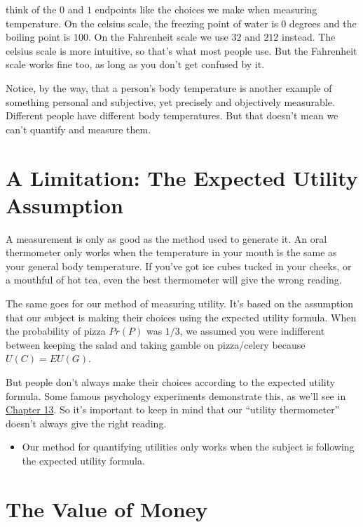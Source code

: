 \documentclass[justified]{tufte-book}
\renewcommand{\u}{U}
\newcommand{\p}{Pr}
\newcommand{\EU}{EU}
\newenvironment{warning}{\begin{itemize}\item[\faBan]}{\end{itemize}}
\theoremstyle{definition}
\theoremstyle{definition}
\theoremstyle{definition}
\theoremstyle{definition}
\theoremstyle{remark}
\begin{document}
 think of the \(0\) and \(1\) endpoints like the choices we make when measuring temperature. On the celsius scale, the freezing point of water is \(0\) degrees and the boiling point is \(100\). On the Fahrenheit scale we use \(32\) and \(212\) instead. The celsius scale is more intuitive, so that's what most people use. But the Fahrenheit scale works fine too, as long as you don't get confused by it.

Notice, by the way, that a person's body temperature is another example of something personal and subjective, yet precisely and objectively measurable. Different people have different body temperatures. But that doesn't mean we can't quantify and measure them.

\hypertarget{a-limitation-the-expected-utility-assumption}{%
\section{A Limitation: The Expected Utility Assumption}\label{a-limitation-the-expected-utility-assumption}}

A measurement is only as good as the method used to generate it. An oral thermometer only works when the temperature in your mouth is the same as your general body temperature. If you've got ice cubes tucked in your cheeks, or a mouthful of hot tea, even the best thermometer will give the wrong reading.

The same goes for our method of measuring utility. It's based on the assumption that our subject is making their choices using the expected utility formula. When the probability of pizza \(\p(P)\) was \(1/3\), we assumed you were indifferent between keeping the salad and taking gamble on pizza/celery because \(\u(C) = \EU(G)\).

But people don't always make their choices according to the expected utility formula. Some famous psychology experiments demonstrate this, as we'll see in \protect\hyperlink{challenges-to-expected-utility}{Chapter 13}. So it's important to keep in mind that our ``utility thermometer'' doesn't always give the right reading.

\begin{warning}
Our method for quantifying utilities only works when the subject is
following the expected utility formula.
\end{warning}

\hypertarget{the-value-of-money}{%
\section{The Value of Money}\label{the-value-of-money}}
\end{document}

